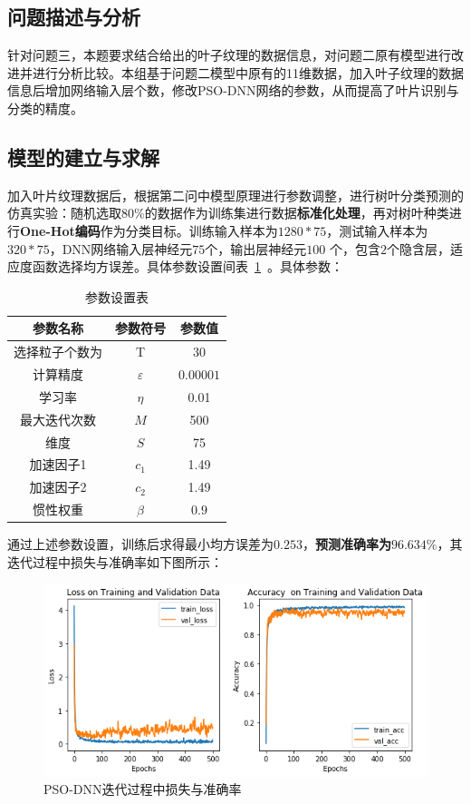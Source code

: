 \documentclass{whutmod}
\begin{document}
    \subsection{问题描述与分析}
    针对问题三，本题要求结合给出的叶子纹理的数据信息，对问题二原有模型进行改进并进行分析比较。本组基于问题二模型中原有的11维数据，加入叶子纹理的数据信息后增加网络输入层个数，修改PSO-DNN网络的参数，从而提高了叶片识别与分类的精度。
		
    \subsection{模型的建立与求解}
    加入叶片纹理数据后，根据第二问中模型原理进行参数调整，进行树叶分类预测的仿真实验：随机选取80\%的数据作为训练集进行数据\textbf{标准化处理}，再对树叶种类进行\textbf{One-Hot编码}作为分类目标。训练输入样本为$1280*75$，测试输入样本为$320*75$，DNN网络输入层神经元$75$个，输出层神经元$100$ 个，包含$2$个隐含层，适应度函数选择均方误差。具体参数设置间表~\ref{canshu2}~。具体参数：
    \begin{table}[H]
    	\centering		\caption{参数设置表}\label{canshu2}
    	\begin{tabular}{ccc}
    		\toprule[2pt]
    		\multicolumn{1}{m{4cm}}{\centering 参数名称}
    		& \multicolumn{1}{m{3cm}}{\centering 参数符号}
    		&\multicolumn{1}{m{3cm}}{\centering 参数值}
    		\\
    		\midrule[1pt]
    		选择粒子个数为	 &  T &$30$ \\ 
    		计算精度	 &  $\varepsilon$&$0.00001$  \\ 
    		学习率	 &  $\eta $ &0.01 \\ 
    		最大迭代次数	 &  $M$ &500\\ 
    		维度	 &  $S$ &75 \\ 
    		加速因子1	 &  $c_{1}$ &1.49\\ 
    		加速因子2	 &  $c_{2}$ &1.49 \\ 
    		惯性权重	 &  $\beta $ &$0.9$ \\ 
    		\bottomrule[2pt]	
    	\end{tabular}
        \end{table}
    
    
    通过上述参数设置，训练后求得最小均方误差为$0.253$，\textbf{预测准确率为$96.634\%$}，其迭代过程中损失与准确率如下图所示：
    \begin{figure}[H]
    	\centering
    	\includegraphics[width=\textwidth]{figures/moxingsan.png}
    	\caption{PSO-DNN迭代过程中损失与准确率}\label{xxxx}
    \end{figure}	
    
\end{document}

